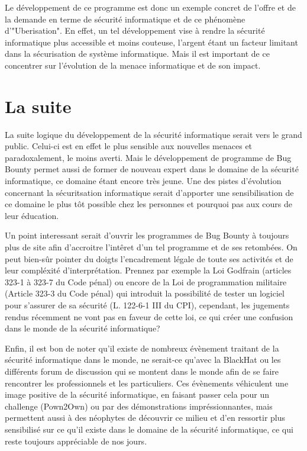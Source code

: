 \documentclass[a4paper]{memoir}
\begin{document}
Le développement de ce programme est donc un exemple concret de l'offre et de la demande en terme de sécurité informatique et de ce phénomène d'"Uberisation".
En effet, un tel développement vise à rendre la sécurité informatique plus accessible et moins couteuse, l'argent étant un facteur limitant dans la sécurisation de système informatique.
Mais il est important de ce concentrer sur l'évolution de la menace informatique et de son impact.

\chapter{La suite}

La suite logique du développement de la sécurité informatique serait vers le grand public. Celui-ci est en effet le plus sensible aux nouvelles menaces et paradoxalement, le moins averti. 
Mais le développement de programme de Bug Bounty permet aussi de former de nouveau expert dans le domaine de la sécurité informatique, ce domaine étant encore très jeune.
Une des pistes d'évolution concernant la sécuritsation informatique serait d'apporter une sensibilisation de ce domaine le plus tôt possible chez les personnes et pourquoi pas aux cours de leur éducation. 

Un point interessant serait d'ouvrir les programmes de Bug Bounty à toujours plus de site afin d'accroitre l'intêret d'un tel programme et de ses retombées.
On peut bien-sûr pointer du doigts l'encadrement légale de toute ses activités et de leur compléxité d'interprétation. Prennez par exemple la Loi Godfrain (articles 323-1 à 323-7 du Code pénal) ou encore de la Loi de programmation militaire (Article 323-3 du Code pénal) qui introduit la possibilité de tester un logiciel pour s'assurer de sa sécurité (L. 122-6-1 III du CPI), cependant, les jugements rendus récemment ne vont pas en faveur de cette loi, ce qui créer une confusion dans le monde de la sécurité informatique?

Enfin, il est bon de noter qu'il existe de nombreux évènement traitant de la sécurité informatique dans le monde, ne serait-ce qu'avec la BlackHat ou les différents forum de discussion qui se montent dans le monde afin de se faire rencontrer les professionnels et les particuliers. Ces évènements véhiculent une image positive de la sécurité informatique, en faisant passer cela pour un challenge (Pown2Own) ou par des démonstrations impréssionnantes, mais permettent aussi à des néophytes de découvrir ce milieu et d'en ressortir plus sensibilisé sur ce qu'il existe dans le domaine de la sécurité informatique, ce qui reste toujours appréciable de nos jours.
\end{document}
